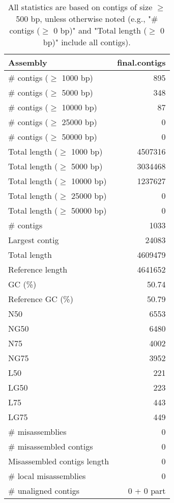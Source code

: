 \documentclass[12pt,a4paper]{article}
\begin{document}
\begin{table}[ht]
\begin{center}
\caption{All statistics are based on contigs of size $\geq$ 500 bp, unless otherwise noted (e.g., "\# contigs ($\geq$ 0 bp)" and "Total length ($\geq$ 0 bp)" include all contigs).}
\begin{tabular}{|l*{1}{|r}|}
\hline
Assembly & final.contigs \\ \hline
\# contigs ($\geq$ 1000 bp) & 895 \\ \hline
\# contigs ($\geq$ 5000 bp) & 348 \\ \hline
\# contigs ($\geq$ 10000 bp) & 87 \\ \hline
\# contigs ($\geq$ 25000 bp) & 0 \\ \hline
\# contigs ($\geq$ 50000 bp) & 0 \\ \hline
Total length ($\geq$ 1000 bp) & 4507316 \\ \hline
Total length ($\geq$ 5000 bp) & 3034468 \\ \hline
Total length ($\geq$ 10000 bp) & 1237627 \\ \hline
Total length ($\geq$ 25000 bp) & 0 \\ \hline
Total length ($\geq$ 50000 bp) & 0 \\ \hline
\# contigs & 1033 \\ \hline
Largest contig & 24083 \\ \hline
Total length & 4609479 \\ \hline
Reference length & 4641652 \\ \hline
GC (\%) & 50.74 \\ \hline
Reference GC (\%) & 50.79 \\ \hline
N50 & 6553 \\ \hline
NG50 & 6480 \\ \hline
N75 & 4002 \\ \hline
NG75 & 3952 \\ \hline
L50 & 221 \\ \hline
LG50 & 223 \\ \hline
L75 & 443 \\ \hline
LG75 & 449 \\ \hline
\# misassemblies & 0 \\ \hline
\# misassembled contigs & 0 \\ \hline
Misassembled contigs length & 0 \\ \hline
\# local misassemblies & 0 \\ \hline
\# unaligned contigs & 0 + 0 part \\ \hline

\end{tabular}
\end{center}
\end{table}
\end{document}
